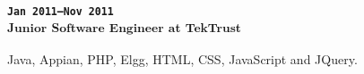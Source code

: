 \subsubsection{
\textsubscript{
\uppercase{\texttt{Jan 2011--Nov 2011}}\\
Junior Software Engineer at TekTrust
}
}
Java, Appian, PHP, Elgg, HTML, CSS, JavaScript and JQuery.
